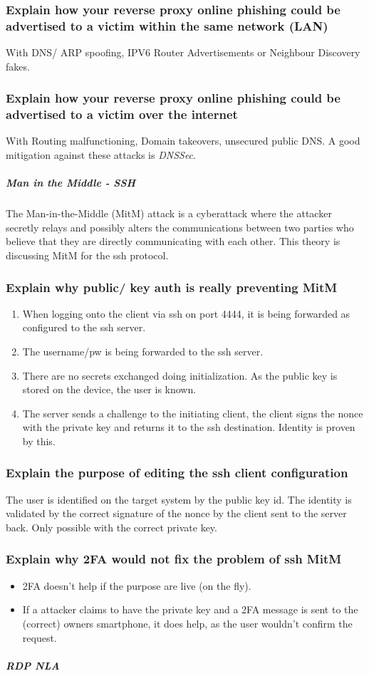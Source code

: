 \subsubsection{Explain how your reverse proxy online phishing could be advertised to a victim within the same network (LAN)}
With DNS/ ARP spoofing, IPV6 Router Advertisements or Neighbour Discovery fakes.
\subsubsection{Explain how your reverse proxy online phishing could be advertised to a victim over the internet}
With Routing malfunctioning, Domain takeovers, unsecured public DNS. A good mitigation against these attacks is \textit{DNSSec}.
\subparagraph{Man in the Middle - SSH}
The Man-in-the-Middle (MitM) attack is a cyberattack where the attacker secretly relays and possibly alters the communications between two parties who believe that they are directly communicating with each other. This theory is discussing MitM for the ssh protocol.
\subsubsection{Explain why public/ key auth is really preventing MitM}
\begin{enumerate}
    \item When logging onto the client via ssh on port 4444, it is being forwarded as configured to the ssh server.
    \item The username/pw is being forwarded to the ssh server.
    \item There are no secrets exchanged doing initialization. As the public key is stored on the device, the user is \glqq known\grqq.
    \item The server sends a challenge to the initiating client, the client signs the nonce with the private key and returns it to the ssh destination. Identity is proven by this.
\end{enumerate}
\subsubsection{Explain the purpose of editing the ssh client configuration}
The user is identified on the target system by the public key id. The identity is validated by the correct signature of the nonce by the client sent to the server back. Only possible with the correct private key.
\subsubsection{Explain why 2FA would not fix the problem of ssh MitM}
\begin{itemize}
    \item 2FA doesn't help if the purpose are live (on the fly).
    \item If a attacker claims to have the private key and a 2FA message is sent to the (correct) owners smartphone, it does help, as the user wouldn't confirm the request.
\end{itemize}
\subparagraph{RDP NLA}

